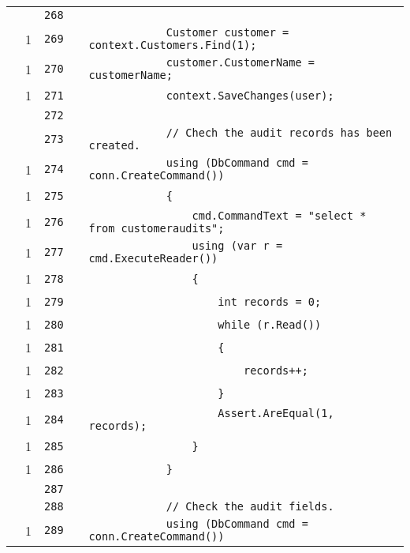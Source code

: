 \documentclass[a4paper,10pt]{article}
\begin{document}
\begin{longtable}[l]{lrrll}
\cellcolor{gray} &  & \verb~268~ & & \verb~~\\
\cellcolor{green} & 1 & \verb~269~ & & \verb~            Customer customer = context.Customers.Find(1);~\\
\cellcolor{green} & 1 & \verb~270~ & & \verb~            customer.CustomerName = customerName;~\\
\cellcolor{green} & 1 & \verb~271~ & & \verb~            context.SaveChanges(user);~\\
\cellcolor{gray} &  & \verb~272~ & & \verb~~\\
\cellcolor{gray} &  & \verb~273~ & & \verb~            // Chech the audit records has been created.~\\
\cellcolor{green} & 1 & \verb~274~ & & \verb~            using (DbCommand cmd = conn.CreateCommand())~\\
\cellcolor{green} & 1 & \verb~275~ & & \verb~            {~\\
\cellcolor{green} & 1 & \verb~276~ & & \verb~                cmd.CommandText = "select * from customeraudits";~\\
\cellcolor{green} & 1 & \verb~277~ & & \verb~                using (var r = cmd.ExecuteReader())~\\
\cellcolor{green} & 1 & \verb~278~ & & \verb~                {~\\
\cellcolor{green} & 1 & \verb~279~ & & \verb~                    int records = 0;~\\
\cellcolor{green} & 1 & \verb~280~ & & \verb~                    while (r.Read())~\\
\cellcolor{green} & 1 & \verb~281~ & & \verb~                    {~\\
\cellcolor{green} & 1 & \verb~282~ & & \verb~                        records++;~\\
\cellcolor{green} & 1 & \verb~283~ & & \verb~                    }~\\
\cellcolor{green} & 1 & \verb~284~ & & \verb~                    Assert.AreEqual(1, records);~\\
\cellcolor{green} & 1 & \verb~285~ & & \verb~                }~\\
\cellcolor{green} & 1 & \verb~286~ & & \verb~            }~\\
\cellcolor{gray} &  & \verb~287~ & & \verb~~\\
\cellcolor{gray} &  & \verb~288~ & & \verb~            // Check the audit fields.~\\
\cellcolor{green} & 1 & \verb~289~ & & \verb~            using (DbCommand cmd = conn.CreateCommand())~\\

\end{longtable}
\end{document}
